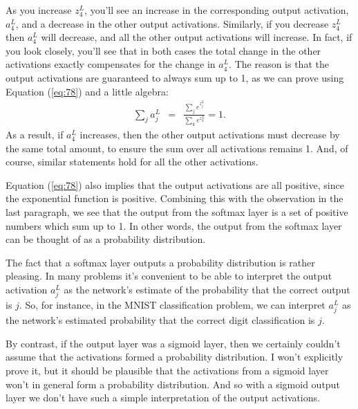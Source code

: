 \documentclass[a4paper,twoside,10pt]{book}
\begin{document}
As you increase $z^L_4$, you'll see an increase in the corresponding output activation, $a^L_4$, and a decrease in the other output activations. Similarly, if you decrease $z^L_4$ then $a^L_4$ will decrease, and all the other output activations will increase. In fact, if you look closely, you'll see that in both cases the total change in the other activations exactly compensates for the change in $a^L_4$. The reason is that the output activations are guaranteed to always sum up to 1, as we can prove using Equation (\ref{eq:78}) and a little algebra:
\begin{eqnarray}
\sum_j a^L_j & = & \frac{\sum_j e^{z^L_j}}{\sum_k e^{z^L_k}} = 1.
\label{eq:79}\end{eqnarray}
As a result, if $a^L_4$ increases, then the other output activations must decrease by the same total amount, to ensure the sum over all activations remains 1. And, of course, similar statements hold for all the other activations.

Equation (\ref{eq:78}) also implies that the output activations are all positive, since the exponential function is positive. Combining this with the observation in the last paragraph, we see that the output from the softmax layer is a set of positive numbers which sum up to 1. In other words, the output from the softmax layer can be thought of as a probability distribution.

The fact that a softmax layer outputs a probability distribution is rather pleasing. In many problems it's convenient to be able to interpret the output activation $a^L_j$ as the network's estimate of the probability that the correct output is $j$. So, for instance, in the MNIST classification problem, we can interpret $a^L_j$ as the network's estimated probability that the correct digit classification is $j$.

By contrast, if the output layer was a sigmoid layer, then we certainly couldn't assume that the activations formed a probability distribution. I won't explicitly prove it, but it should be plausible that the activations from a sigmoid layer won't in general form a probability distribution. And so with a sigmoid output layer we don't have such a simple interpretation of the output activations.
\end{document}
